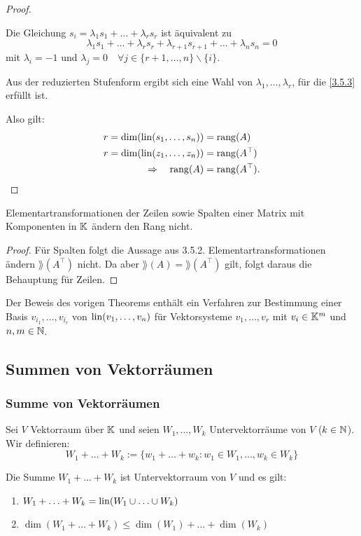 \begin{proof}
\begin{enumerate}
			Die Gleichung $ s_i = \lambda_1 s_1 + \ldots + \lambda_r s_r $ ist äquivalent zu
			\begin{equation}
				\lambda_1 s_1 + \ldots + \lambda_r s_r + \lambda_{r+1} s_{r+1} + \ldots + \lambda_n s_n = 0 \label{3.5.3}
			\end{equation} mit $ \lambda_i = -1 $ und $ \lambda_j = 0 \quad \forall j \in \{r+1,\ldots,n\} \backslash\{i\} $.

			Aus der reduzierten Stufenform ergibt sich eine Wahl von $ \lambda_1,\ldots, \lambda_r $, für die \eqref{3.5.3} erfüllt ist.
	\end{enumerate}
	Also gilt:
	\begin{align*}
		r = \dim(\operatorname{lin}(s_1,\ldots,s_n)) &= \operatorname{rang}(A) \\
		r = \dim(\operatorname{lin}(z_1,\ldots,z_n)) &= \operatorname{rang}(A^\top) \\
		\Rightarrow \quad \operatorname{rang}(A) &= \operatorname{rang}(A^\top). \qedhere
	\end{align*}
\end{proof}

\begin{klr}
	Elementartransformationen der Zeilen sowie Spalten einer Matrix mit Komponenten in $ \mathbb K $ ändern den Rang nicht.
\end{klr}
\begin{proof}
	Für Spalten folgt die Aussage aus 3.5.2. Elementartransformationen ändern $ \rang(A^\top) $ nicht. Da aber $ \rang(A) = \rang(A^\top) $ gilt, folgt daraus die Behauptung für Zeilen.
\end{proof}

\begin{bem}
	Der Beweis des vorigen Theorems enthält ein Verfahren zur Bestimmung einer Basis $ v_{i_1} , \ldots , v_{i_r} $ von $ \operatorname{lin}(v_1, \ldots, v_n) $ für Vektorsysteme $ v_1,\ldots,v_r $ mit $ v_i \in \mathbb K^m $ und $ n,m \in \mathbb N $.
\end{bem}

\clearpage
\subsection{Summen von Vektorräumen}
\subsubsection{Summe von Vektorräumen}
Sei $ V $ Vektorraum über $ \mathbb K $ und seien $ W_1, \ldots , W_k $ Untervektorräume von $ V $ ($ k \in \mathbb N $). Wir definieren:
\begin{equation}
	W_1 + \ldots + W_k := \{ w_1 + \ldots + w_k : w_1 \in W_1, \ldots, w_k \in W_k \}
\end{equation}
\begin{bem}
	Die Summe $ W_1 + \ldots + W_k $ ist Untervektorraum von $ V $ und es gilt:
	\begin{enumerate}
		\item
			$ W_1 + \ldots + W_k = \operatorname{lin}( W_1 \cup \ldots \cup W_k ) $
		\item
			$ \dim(W_1 + \ldots + W_k) \leq \dim(W_1) + \ldots + \dim(W_k) $
	\end{enumerate}
\end{bem}

